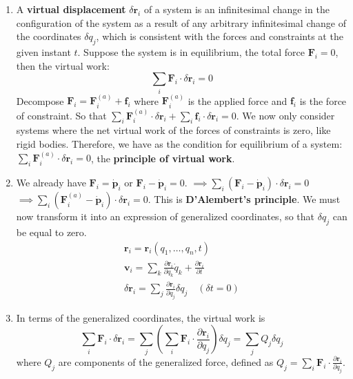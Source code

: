 \documentclass[12pt,a4paper]{article}
\theoremstyle{definition}
\theoremstyle{remark}
\renewcommand{\vec}[1]{\mathbf{#1}}
\begin{document}
	\begin{enumerate}
		\item A \textbf{virtual displacement} $\delta\vec{r}_i$ of a system is an infinitesimal change in the configuration of the system as a result of any arbitrary infinitesimal change of the coordinates $\delta q_j$, which is consistent with the forces and constraints at the given instant $t$. Suppose the system is in equilibrium, the total force $\vec{F}_i = 0$, then the virtual work:
		\begin{equation*}
			\sum_i \vec{F}_i \cdot \delta\vec{r}_i = 0
		\end{equation*}
		Decompose $\vec{F}_i = \vec{F}_i^{(a)} + \vec{f}_i$ where $\vec{F}_i^{(a)}$ is the applied force and $\vec{f}_i$ is the force of constraint.
		So that $\sum_i \vec{F}_i^{(a)} \cdot \delta\vec{r}_i + \sum_i \vec{f}_i \cdot \delta\vec{r}_i = 0$.
		We now only consider systems where the net virtual work of the forces of constraints is zero, like rigid bodies.
		Therefore, we have as the condition for equilibrium of a system: $\sum_i \vec{F}_i^{(a)} \cdot \delta\vec{r}_i = 0$, the \textbf{principle of virtual work}.
		
		\item We already have $\vec{F}_i = \dot{\vec{p}}_i$ or $\vec{F}_i - \dot{\vec{p}}_i = 0$.
		$\implies \sum_i (\vec{F}_i - \dot{\vec{p}}_i) \cdot \delta\vec{r}_i = 0$
		$\implies \sum_i (\vec{F}_i^{(a)} - \dot{\vec{p}}_i) \cdot \delta\vec{r}_i = 0$. This is \textbf{D'Alembert's principle}.
		We must now transform it into an expression of generalized coordinates, so that $\delta q_j$ can be equal to zero.
		\begin{gather*}
			\vec{r}_i = \vec{r}_i(q_1, \dots, q_n, t) \\
			\vec{v}_i = \sum_k \frac{\partial \vec{r}_i}{\partial q_k}\dot{q}_k + \frac{\partial \vec{r}_i}{\partial t} \\
			\delta\vec{r}_i = \sum_j \frac{\partial \vec{r}_i}{\partial q_j} \delta q_j \quad (\delta t = 0)
		\end{gather*}
		
		\item In terms of the generalized coordinates, the virtual work is
		\begin{equation*}
			\sum_i \vec{F}_i \cdot \delta\vec{r}_i = \sum_j \left( \sum_i \vec{F}_i \cdot \frac{\partial \vec{r}_i}{\partial q_j} \right) \delta q_j = \sum_j Q_j \delta q_j
		\end{equation*}
		where $Q_j$ are components of the generalized force, defined as $Q_j = \sum_i \vec{F}_i \cdot \frac{\partial \vec{r}_i}{\partial q_j}$.
		

\end{enumerate}
\end{document}
